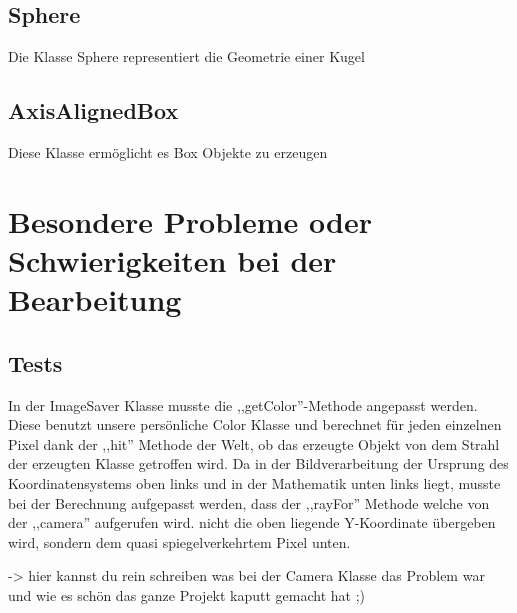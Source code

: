 \documentclass[14pt]{extarticle}
\begin{document}
\subsection{Sphere}
Die Klasse Sphere representiert die Geometrie einer Kugel
\subsection{AxisAlignedBox}
Diese Klasse ermöglicht es Box Objekte zu erzeugen
\section{Besondere Probleme oder Schwierigkeiten bei der Bearbeitung}
\subsection{Tests}
In der ImageSaver Klasse musste die ,,getColor''-Methode angepasst werden. Diese benutzt unsere persönliche Color Klasse und berechnet für jeden einzelnen Pixel dank der ,,hit'' Methode der Welt, ob das erzeugte Objekt von dem Strahl der erzeugten Klasse getroffen wird. Da in der Bildverarbeitung der Ursprung des Koordinatensystems oben links und in der Mathematik unten links liegt, musste bei der Berechnung aufgepasst werden, dass der ,,rayFor'' Methode welche von der ,,camera'' aufgerufen wird. nicht die oben liegende Y-Koordinate übergeben wird, sondern dem quasi spiegelverkehrtem Pixel unten. 

-> hier kannst du rein schreiben was bei der Camera Klasse das Problem war und wie es schön das ganze Projekt kaputt gemacht hat ;) 
\end{document}
